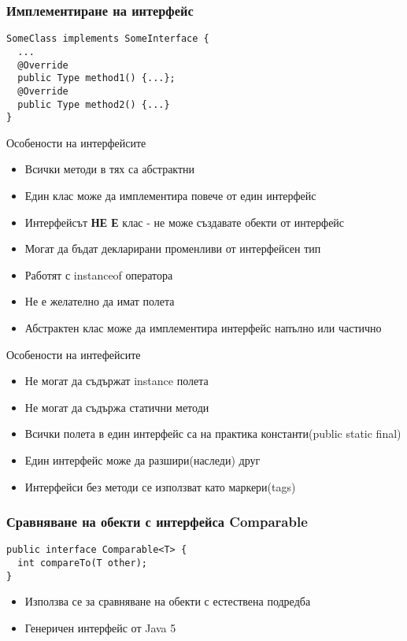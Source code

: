 \documentclass{beamer}
\begin{document}
\begin{frame}[fragile]
  \frametitle{Имплементиране на интерфейс}
  \transdissolve
\begin{lstlisting}
SomeClass implements SomeInterface {
  ...  
  @Override
  public Type method1() {...};
  @Override
  public Type method2() {...}
}
\end{lstlisting}
\end{frame}

\begin{frame}{Особености на интерфейсите}
  \transdissolve
  \begin{itemize}
  \item Всички методи в тях са абстрактни
  \item Един клас може да имплементира повече от един интерфейс
  \item Интерфейсът \textbf{НЕ Е} клас - не може създавате обекти от
    интерфейс
  \item Могат да бъдат декларирани променливи от интерфейсен тип
  \item Работят с instanceof оператора
  \item Не е желателно да имат полета
  \item Абстрактен клас може да имплементира интерфейс напълно или
    частично
  \end{itemize}
\end{frame}

\begin{frame}{Особености на интефейсите}
  \transdissolve
  \begin{itemize}
  \item Не могат да съдържат instance полета
  \item Не могат да съдържа статични методи
  \item Всички полета в един интерфейс са на практика константи(public
    static final)
  \item Един интерфейс може да разшири(наследи) друг
  \item Интерфейси без методи се използват като маркери(tags)
  \end{itemize}
\end{frame}

\begin{frame}[fragile]
\frametitle{Сравняване на обекти с интерфейса Comparable}
\transdissolve
\begin{lstlisting}
public interface Comparable<T> {
  int compareTo(T other);
}
\end{lstlisting}
\begin{itemize}
  \item Използва се за сравняване на обекти с естествена подредба
  \item Генеричен интерфейс от Java 5
\end{itemize}

\end{frame}
\end{document}
